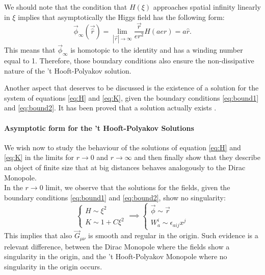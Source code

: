 \documentclass[main.tex]{subfiles}
\begin{document}
 We should note that the condition that $H(\xi)$ approaches  spatial infinity linearly in $\xi$ implies that asymptotically the Higgs field has the following form: 
 \begin{equation}
 \vec{\phi}_{\infty}(\vec{\hat{r}}) = \lim_{|\vec{r}| \to \infty } \frac{\vec{r}}{er^2}H(aer) = a \hat{r}.
 \end{equation}
 This means that $\vec{\phi}_{\infty}$ is homotopic to the identity and has a winding number equal to 1. Therefore, those boundary conditions also ensure the non-dissipative nature of the  't Hooft-Polyakov solution.
 
Another aspect that deserves to be discussed is the existence of a solution for the system of equations \ref{eq:H} and \ref{eq:K}, given the boundary conditions \ref{eq:bound1} and \ref{eq:bound2}. It has been proved that a solution actually exists \cite{Taubes:Sol}.

\paragraph{Asymptotic form for the 't Hooft-Polyakov Solutions} 
We wish now to study the behaviour of the solutions of equation \ref{eq:H} and \ref{eq:K} in the limits for $r \to 0$ and $r \to \infty$ and then finally show that they describe an object of finite size that at big distances behaves analogously to the Dirac Monopole.\\

In the $r \to 0$ limit, we observe that the solutions for the fields, given the boundary conditions \ref{eq:bound1} and \ref{eq:bound2}, show no singularity: 
\begin{equation}
  \begin{cases}  
  H \sim \xi^2\\
  K \sim 1 + C \xi^2 
  \end{cases}
  \implies
  \begin{cases}
  \vec{\phi} \sim \vec{r}\\
  W^{i}_{a} \sim \epsilon_{aij}x^j
  
  \end{cases}
\end{equation}
This implies that also   $\vec{G}_{\mu \nu}$ is smooth and regular in the origin. Such evidence is a relevant difference, between the Dirac Monopole where the fields show a singularity in the origin, and the 't Hooft-Polyakov Monopole where no singularity in the origin occurs. \\
\end{document}
